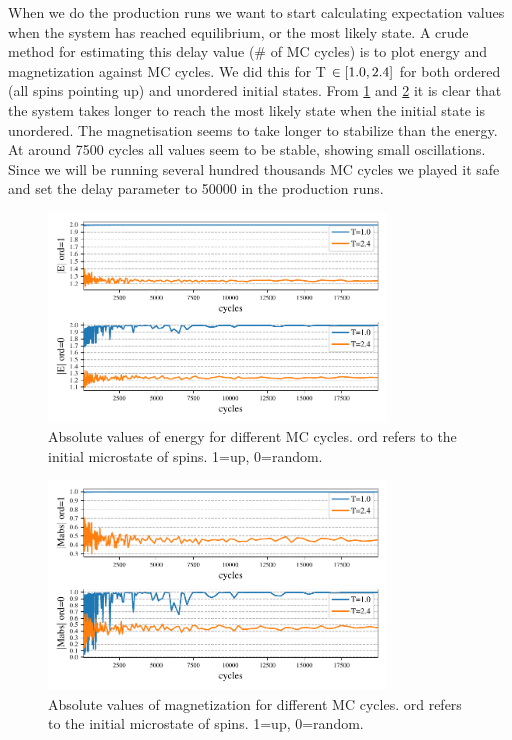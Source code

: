 When we do the production runs we want to start calculating expectation values
when the system has reached equilibrium, or the most likely state. A crude
method for estimating this delay value (\# of MC cycles) is to plot energy and
magnetization against MC cycles. We did this for T $\in \left[1.0,2.4\right]$ for both
ordered (all spins pointing up) and unordered initial states. From
\cref{fig:equi_E} and \cref{fig:equi_M} it is clear that the system takes longer
to reach the most likely state when the initial state is unordered. The
magnetisation seems to take longer to stabilize than the energy. At around 7500
cycles all values seem to be stable, showing small oscillations. Since we will
be running several hundred thousands MC cycles we played it safe and set the
delay parameter to 50000 in the production runs.

\begin{figure}[H]
  \centering
  \includegraphics[width=0.8\textwidth]{../figures/equilibrium_E.pdf}
  \caption{Absolute values of energy for different MC cycles.
  ord refers to the initial microstate of spins. 1=up, 0=random.}
  \label{fig:equi_E}
\end{figure}


\begin{figure}[H]
  \centering
  \includegraphics[width=0.8\textwidth]{../figures/equilibrium_Mabs.pdf}
  \caption{Absolute values of magnetization for different MC cycles.
  ord refers to the initial microstate of spins. 1=up, 0=random.}
  \label{fig:equi_M}
\end{figure}




